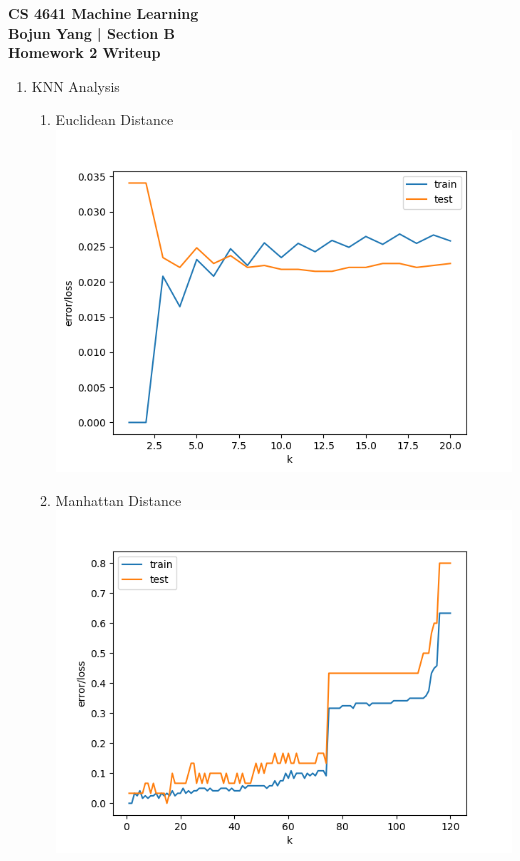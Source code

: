 \documentclass[12pt]{article}
\begin{document}
	\begin{center}
			\textbf{CS 4641 Machine Learning} \vspace*{2mm}
			\textbf{\\ Bojun Yang | Section B} \vspace*{2mm}
			\textbf{\\ Homework 2 Writeup }
	\end{center}


\begin{enumerate}[noitemsep,topsep=0pt]
\item KNN Analysis
\begin{enumerate}
    \item Euclidean Distance
    \\ \includegraphics[height=0.4\textheight]{HTRU2_euc}
    \item Manhattan Distance
    \\ \includegraphics[height=0.4\textheight]{iris_euc}

\end{enumerate}
\end{enumerate}
\end{document}
